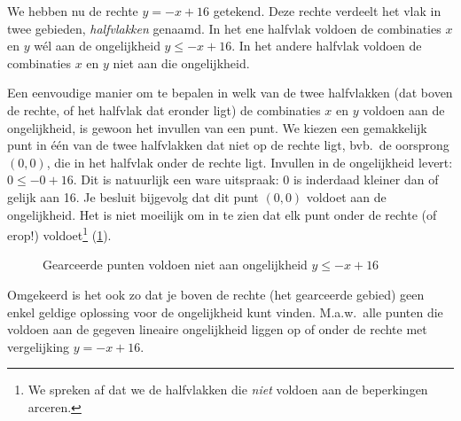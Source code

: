 We hebben nu de rechte $y=-x+16$ getekend. Deze rechte verdeelt het vlak in twee gebieden, \emph{halfvlakken} genaamd. In het ene halfvlak voldoen de combinaties $x$ en $y$ w\'el aan de ongelijkheid $y \leqslant -x + 16$. In het andere halfvlak voldoen de combinaties $x$ en $y$ niet aan die ongelijkheid. 


Een eenvoudige manier om te bepalen in welk van de twee halfvlakken
(dat boven de rechte, of het halfvlak dat eronder ligt) de combinaties $x$ en $y$ voldoen aan  de ongelijkheid, is gewoon het invullen van
een punt. We kiezen een gemakkelijk punt in \'e\'en  van de twee
halfvlakken dat niet op de rechte ligt, bvb.\ de oorsprong $(0,0)$, die in het halfvlak onder
de rechte ligt. Invullen in de ongelijkheid levert: $0 \leq
-0+16$. Dit is natuurlijk een ware uitspraak: 0 is inderdaad
kleiner dan of gelijk aan 16. Je besluit bijgevolg dat dit punt
$(0,0)$ voldoet aan de ongelijkheid. Het is niet moeilijk om in
te zien dat elk punt onder de rechte (of erop!) voldoet\footnote{We
spreken af dat we de halfvlakken die \emph{niet} voldoen aan de beperkingen arceren.}
(\cref{fig:ongelijkheid}).

\begin{figure}[htbp]
    \centering
{}
    \caption{Gearceerde punten voldoen niet aan ongelijkheid $y \leqslant -x+16$}
    \label{fig:ongelijkheid}
\end{figure}

Omgekeerd is het ook zo dat je boven de rechte (het gearceerde
gebied) geen enkel geldige oplossing voor de ongelijkheid kunt
vinden. M.a.w.\ alle punten die voldoen aan de gegeven lineaire ongelijkheid
liggen op of onder de rechte met vergelijking $y=-x+16$.



